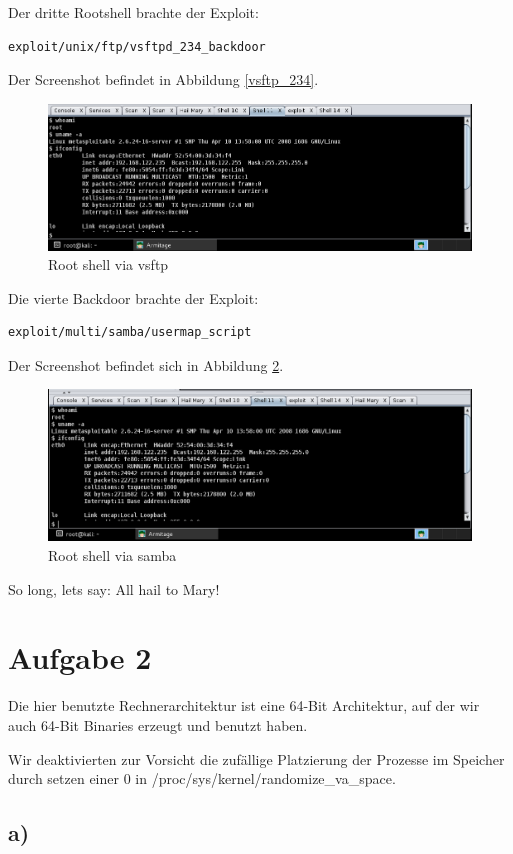 \documentclass[10pt,a4paper]{article}
\begin{document}
Der dritte Rootshell brachte der Exploit:
\begin{verbatim}
exploit/unix/ftp/vsftpd_234_backdoor
\end{verbatim}
Der Screenshot befindet in Abbildung \ref{vsftp_234}.
\begin{figure}
\includegraphics[scale=0.5]{figures/vfstp.png}
\caption{Root shell via vsftp}
\label{vfstp_234}
\end{figure}

Die vierte Backdoor brachte der Exploit:
\begin{verbatim}
exploit/multi/samba/usermap_script
\end{verbatim}
Der Screenshot befindet sich in Abbildung \ref{samba}.
\begin{figure}
\includegraphics[scale=0.5]{figures/samba.png}
\caption{Root shell via samba}
\label{samba}
\end{figure}

So long, lets say: All hail to Mary!

\section*{Aufgabe 2}

Die hier benutzte Rechnerarchitektur ist eine 64-Bit Architektur, auf der wir auch 64-Bit Binaries erzeugt und benutzt haben.

Wir deaktivierten zur Vorsicht die zufällige Platzierung der Prozesse im Speicher durch setzen einer 0 in /proc/sys/kernel/randomize\_va\_space.

\subsection*{a)}
\end{document}
